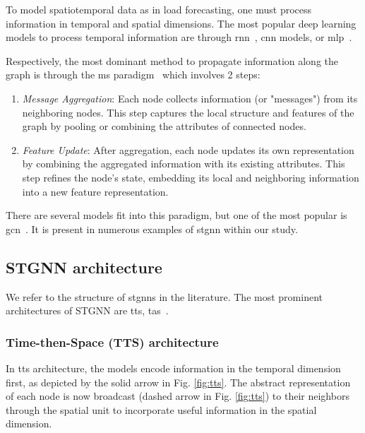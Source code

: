 To model spatiotemporal data as in load forecasting, one must process information in temporal and spatial dimensions. 
The most popular deep learning models to process temporal information are through \acrfull{rnn}~\cite{sutskever_sequence_2014}, \acrfull{cnn} models, or \acrfull{mlp}~\cite{rodrigues_short-term_2023}. 

Respectively, the most dominant method to propagate information along the graph is through the \acrfull{ms} paradigm~\cite{cini_graph_2023} which involves 2 steps:
\begin{enumerate}
    \item \textit{Message Aggregation}: Each node collects information (or "messages") from its neighboring nodes. This step captures the local structure and features of the graph by pooling or combining the attributes of connected nodes. 
    \item \textit{Feature Update}: After aggregation, each node updates its own representation by combining the aggregated information with its existing attributes. This step refines the node's state, embedding its local and neighboring information into a new feature representation.
\end{enumerate}

There are several models fit into this paradigm, but one of the most popular is \acrfull{gcn}~\cite{mansoor_spatio-temporal_2023}. It is present in numerous examples of \acrshort{stgnn} within our study.

\subsection{STGNN architecture}\label{subsec:architecture}
We refer to the structure of \glspl{stgnn} in the literature. The most prominent architectures of STGNN are \acrfull{tts}, \acrfull{tas}~\cite{gao_equivalence_2022}.

\subsubsection{Time-then-Space (TTS) architecture}\label{subsubsec:tts}
In \acrshort{tts} architecture, the models encode information in the temporal dimension first, as depicted by the solid arrow in Fig. \ref{fig:tts}. The abstract representation of each node is now broadcast (dashed arrow in Fig. \ref{fig:tts}) to their neighbors through the spatial unit to incorporate useful information in the spatial dimension.

